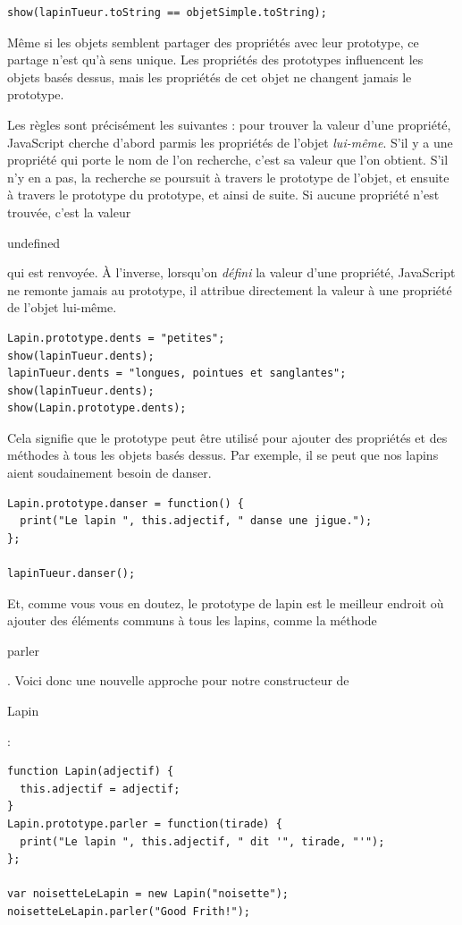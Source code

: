 \documentclass{FramateX}
\renewcommand{\texttt}[1]{\begin{sffamily}{#1}\end{sffamily}}
\begin{document}
\begin{lstlisting}
show(lapinTueur.toString == objetSimple.toString);
\end{lstlisting}
\begin{center}\end{center}

Même si les objets semblent partager des propriétés avec leur prototype,
ce partage n'est qu'à sens unique. Les propriétés des prototypes
influencent les objets basés dessus, mais les propriétés de cet objet ne
changent jamais le prototype.

Les règles sont précisément les suivantes : pour trouver la valeur d'une
propriété, JavaScript cherche d'abord parmis les propriétés de l'objet
\emph{lui-même}. S'il y a une propriété qui porte le nom de l'on
recherche, c'est sa valeur que l'on obtient. S'il n'y en a pas, la
recherche se poursuit à travers le prototype de l'objet, et ensuite à
travers le prototype du prototype, et ainsi de suite. Si aucune
propriété n'est trouvée, c'est la valeur \texttt{undefined} qui est
renvoyée. À l'inverse, lorsqu'on \emph{défini} la valeur d'une
propriété, JavaScript ne remonte jamais au prototype, il attribue
directement la valeur à une propriété de l'objet lui-même.

\begin{lstlisting}
Lapin.prototype.dents = "petites";
show(lapinTueur.dents);
lapinTueur.dents = "longues, pointues et sanglantes";
show(lapinTueur.dents);
show(Lapin.prototype.dents);
\end{lstlisting}
Cela signifie que le prototype peut être utilisé pour ajouter des
propriétés et des méthodes à tous les objets basés dessus. Par exemple,
il se peut que nos lapins aient soudainement besoin de danser.

\begin{lstlisting}
Lapin.prototype.danser = function() {
  print("Le lapin ", this.adjectif, " danse une jigue.");
};

lapinTueur.danser();
\end{lstlisting}
Et, comme vous vous en doutez, le prototype de lapin est le meilleur
endroit où ajouter des éléments communs à tous les lapins, comme la
méthode \texttt{parler}. Voici donc une nouvelle approche pour notre
constructeur de \texttt{Lapin} :

\begin{lstlisting}
function Lapin(adjectif) {
  this.adjectif = adjectif;
}
Lapin.prototype.parler = function(tirade) {
  print("Le lapin ", this.adjectif, " dit '", tirade, "'");
};

var noisetteLeLapin = new Lapin("noisette");
noisetteLeLapin.parler("Good Frith!");
\end{lstlisting}
\begin{center}\end{center}
\end{document}

